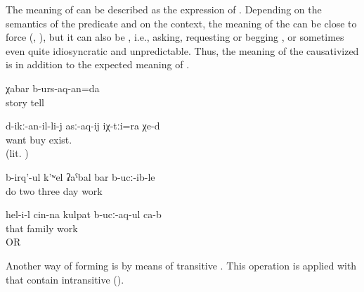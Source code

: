 The meaning of  can be described as the expression of  \citep{Kulikov2011}. Depending on the semantics of the predicate and on the context, the meaning of the  can be close to force (, ), but it can also be , i.e., asking, requesting or begging , or sometimes even quite idiosyncratic and unpredictable. Thus, the meaning of the causativized    is   in addition to the expected  meaning of .
%
\begin{exe}
	\ex	\label{ex:‎We will ask for telling the story}
	\gll	χabar	b-urs-aq-an=da\\
		story	tell\\
	\glt	{}

	\ex	\label{ex:‎They are also for those who want to buy them}
	\gll	d-ikː-an-il-li-j	asː-aq-ij	iχ-tːi=ra	χe-d\\
		want	buy  exist.\\
	\glt	{} (lit. )

	\ex	\label{ex:‎‎‎(they were) building, working for three days}
	\gll	b-irq'-ul	k'ʷel	ʡaˁbal	bar	b-ucː-ib-le\\
		do	two	three	day	work\\
	\glt	{}

	\ex	\label{ex:He feeds his family (he sustains his family working)}
	\gll	hel-i-l	cin-na	kulpat	b-ucː-aq-ul ca-b\\
		that		family	work \\
	\glt	{} OR 
\end{exe}

Another way of forming  is by means of transitive . This operation is applied with  that contain intransitive  ().
